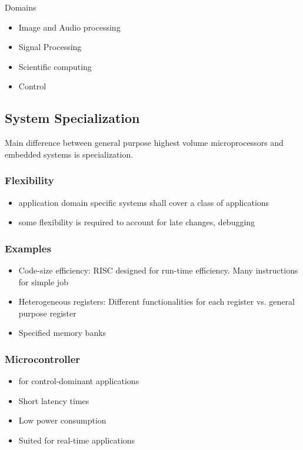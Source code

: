 Domains
\begin{itemize}[noitemsep]
\item Image and Audio processing
\item Signal Processing
\item Scientific computing
\item Control
\end{itemize}

\subsection{System Specialization}
Main difference between general purpose highest 
volume microprocessors and embedded systems is 
specialization.
\subsubsection{Flexibility}
\begin{itemize}[noitemsep]
\item application domain specific systems shall cover a class of 
applications
\item some flexibility is required to account for late changes, 
debugging
\end{itemize}

\subsubsection{Examples}
\begin{itemize}[noitemsep]
\item Code-size efficiency: RISC designed for run-time efficiency. Many instructions for simple job
\item Heterogeneous registers: Different functionalities for each register vs. general purpose register
\item Specified memory banks
\end{itemize}


\subsubsection{Microcontroller}
\begin{itemize}[noitemsep]
\item for control-dominant applications
\item Short latency times
\item Low power consumption
\item Suited for real-time
applications 
\end{itemize}

